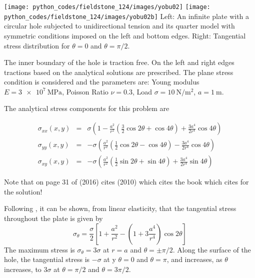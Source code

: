 \begin{center}
\texttt{[image: python\_codes/fieldstone\_124/images/yobu02]}
\texttt{[image: python\_codes/fieldstone\_124/images/yobu02b]}
{\captionfont Left: An infinite plate with a circular hole subjected to unidirectional tension 
and its quarter model with symmetric conditions imposed on the left and bottom edges.
Right: Tangential stress distribution for $\theta=0$  and $\theta=\pi/2$. \cite{yobu02}}
\end{center}


The inner boundary of the hole is traction free. 
On the left and right edges tractions based on the analytical solutions are prescribed.
The {\color{red}plane stress} condition is considered and the parameters are: 
Young modulus $E=\SI{3e7}{\mega\pascal}$, Poisson Ratio $\nu=0.3$, 
Load $\sigma=10~\si{\newton\per\square\meter}$, $a=1~\si{\meter}$.

The analytical stress components for this problem are  

\begin{eqnarray}
\sigma_{xx}(x,y) &=& \sigma \left(  1-\frac{a^2}{r^2}\left(\frac{3}{2}\cos 2\theta + \cos 4\theta \right) 
+ \frac{3a^4}{2r^4} \cos 4\theta \right) \\
\sigma_{yy}(x,y) &=& -\sigma \left( \frac{a^2}{r^2} \left(\frac{1}{2}\cos 2\theta - \cos 4\theta \right) 
- \frac{3a^4}{2r^4} \cos 4\theta \right) \\
\sigma_{xy}(x,y) &=& -\sigma \left( \frac{a^2}{r^2} \left(\frac{1}{2}\sin 2\theta + \sin 4\theta\right) 
+ \frac{3a^4}{2r^4} \sin 4\theta \right) 
\end{eqnarray}

Note that on page 31 of \textcite{rama16} (2016) cites \textcite{chnn10} (2010)
which cites the book \cite[p772]{yobu02} which cites \textcite{budynas} for the solution!

Following \cite{yobu02}, it can be shown, from linear elasticity, that the tangential
stress throughout the plate is given by
\[
\sigma_\theta = \frac{\sigma}{2} \left[ 1+\frac{a^2}{r^2} - 
\left( 1+3\frac{a^4}{r^4}  \right) \cos 2\theta   \right]
\]
The maximum stress is $\sigma_\theta=3\sigma$ at $r=a$ and $\theta=\pm \pi/2$. Along the surface of the hole, 
the tangential stress is $-\sigma$ at y $\theta=0$  and $\theta=\pi$, 
and increases, as $\theta$ increases, to $3\sigma$ at $\theta=\pi/2$ and $\theta=3\pi/2$.



























